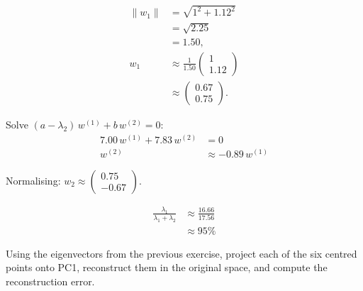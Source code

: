 \begin{align*}
    \|w_1\| & = \sqrt{1^2 + 1.12^2} \\ 
           & = \sqrt{2.25} \\
           & = 1.50,\\
    w_1    & \approx \frac{1}{1.50}\begin{pmatrix}1 \\[3pt] 1.12\end{pmatrix}\\
           & \approx \begin{pmatrix}0.67 \\[3pt] 0.75\end{pmatrix}.
    \end{align*}

Solve $(a - \lambda_2)\,w^{(1)} + b\,w^{(2)} = 0$:
\begin{align*}
    7.00\,w^{(1)} + 7.83\,w^{(2)} &= 0 \\
    w^{(2)} &\approx -0.89\,w^{(1)}
\end{align*}

Normalising: $w_2 \approx \begin{pmatrix} 0.75 \\ -0.67 \end{pmatrix}$.


\begin{align*}
    \frac{\lambda_1}{\lambda_1 + \lambda_2} &\approx \frac{16.66}{17.56} \\
                                              &\approx 95\%
\end{align*}



\vspace{2.5em}


Using the eigenvectors from the previous exercise, project each of the six centred points onto PC1,
reconstruct them in the original space, and compute the reconstruction error.


